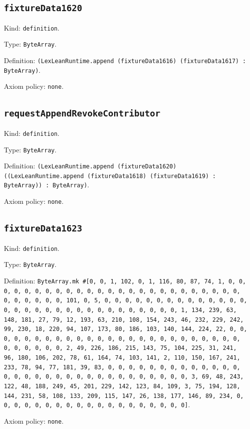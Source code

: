 \documentclass[11pt]{article}
\begin{document}
\subsection*{\texttt{fixtureData1620}}
\noindent Kind: \texttt{definition}.\par
\noindent Type: \texttt{ByteArray}.\par
\noindent Definition: \texttt{(LexLeanRuntime.append (fixtureData1616) (fixtureData1617) : ByteArray)}.\par
\noindent Axiom policy: \texttt{none}.\par
\subsection*{\texttt{requestAppendRevokeContributor}}
\noindent Kind: \texttt{definition}.\par
\noindent Type: \texttt{ByteArray}.\par
\noindent Definition: \texttt{(LexLeanRuntime.append (fixtureData1620) ((LexLeanRuntime.append (fixtureData1618) (fixtureData1619) : ByteArray)) : ByteArray)}.\par
\noindent Axiom policy: \texttt{none}.\par
\subsection*{\texttt{fixtureData1623}}
\noindent Kind: \texttt{definition}.\par
\noindent Type: \texttt{ByteArray}.\par
\noindent Definition: \texttt{ByteArray.mk \#[0, 0, 1, 102, 0, 1, 116, 80, 87, 74, 1, 0, 0, 0, 0, 0, 0, 0, 0, 0, 0, 0, 0, 0, 0, 0, 0, 0, 0, 0, 0, 0, 0, 0, 0, 0, 0, 0, 0, 0, 0, 0, 101, 0, 5, 0, 0, 0, 0, 0, 0, 0, 0, 0, 0, 0, 0, 0, 0, 0, 0, 0, 0, 0, 0, 0, 0, 0, 0, 0, 0, 0, 0, 0, 0, 0, 1, 134, 239, 63, 148, 181, 27, 79, 12, 193, 63, 210, 108, 154, 243, 46, 232, 229, 242, 99, 230, 18, 220, 94, 107, 173, 80, 186, 103, 140, 144, 224, 22, 0, 0, 0, 0, 0, 0, 0, 0, 0, 0, 0, 0, 0, 0, 0, 0, 0, 0, 0, 0, 0, 0, 0, 0, 0, 0, 0, 0, 0, 0, 0, 2, 49, 226, 186, 215, 143, 75, 104, 225, 31, 241, 96, 180, 106, 202, 78, 61, 164, 74, 103, 141, 2, 110, 150, 167, 241, 233, 78, 94, 77, 181, 39, 83, 0, 0, 0, 0, 0, 0, 0, 0, 0, 0, 0, 0, 0, 0, 0, 0, 0, 0, 0, 0, 0, 0, 0, 0, 0, 0, 0, 0, 0, 0, 0, 3, 69, 48, 243, 122, 48, 188, 249, 45, 201, 229, 142, 123, 84, 109, 3, 75, 194, 128, 144, 231, 58, 108, 133, 209, 115, 147, 26, 138, 177, 146, 89, 234, 0, 0, 0, 0, 0, 0, 0, 0, 0, 0, 0, 0, 0, 0, 0, 0, 0, 0, 0]}.\par
\noindent Axiom policy: \texttt{none}.\par
\end{document}
